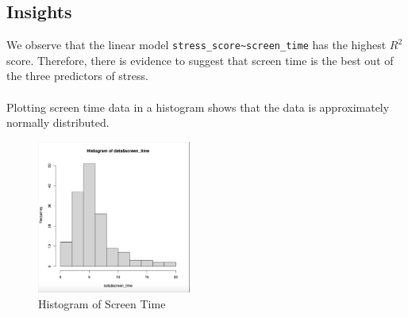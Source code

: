 \documentclass{article}
\theoremstyle{mytheoremstyle}
\theoremstyle{mytheoremstyle}
\theoremstyle{myproblemstyle}
\begin{document}
  \subsection{Insights}

  We observe that the linear model \verb|stress_score~screen_time| has the highest \(R^2\) score. 
  Therefore, there is evidence to suggest that screen time is the best out of the three predictors of stress.\\ 
  \\ 
  Plotting screen time data in a histogram shows that the data is approximately normally distributed.
  \vspace{0.1in}
  \begin{figure}[H]
    \begin{center}
      \includegraphics[width=0.45\textwidth]{figures/screentime_histogram.png}
    \end{center}
    \caption{Histogram of Screen Time}\label{fig:}
  \end{figure}
\end{document}

